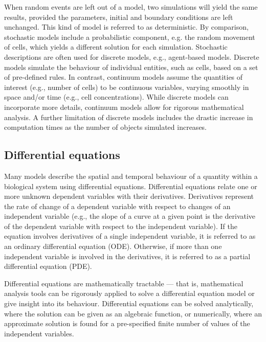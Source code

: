 \documentclass{article}
\begin{document}
When random events are left out of a model, two simulations will yield the same results, provided the parameters, initial and boundary conditions are left unchanged.
This kind of model is referred to as deterministic.
By comparison, stochastic models include a probabilistic component, e.g. the random movement of cells, which yields a different solution for each simulation.
Stochastic descriptions are often used for discrete models, e.g., agent-based models.
Discrete models simulate the behaviour of individual entities, such as cells, based on a set of pre-defined rules.
In contrast, continuum models assume the quantities of interest (e.g., number of cells) to be continuous variables, varying smoothly in space and/or time (e.g., cell concentrations).
While discrete models can incorporate more details, continuum models allow for rigorous mathematical analysis.
A further limitation of discrete models includes the drastic increase in computation times as the number of objects simulated increases.

\subsection{Differential equations}

Many models describe the spatial and temporal behaviour of a quantity within a biological system using differential equations.
Differential equations relate one or more unknown dependent variables with their derivatives. 
Derivatives represent the rate of change of a dependent variable with respect to changes of an independent variable (e.g., the slope of a curve at a given point is the derivative of the dependent variable with respect to the independent variable).
If the equation involves derivatives of a single independent variable, it is referred to as an ordinary differential equation (ODE).
Otherwise, if more than one independent variable is involved in the derivatives, it is referred to as a partial differential equation (PDE).

Differential equations are mathematically tractable --- that is, mathematical analysis tools can be rigorously applied to solve a differential equation model or give insight into its behaviour.
Differential equations can be solved analytically, where the solution can be given as an algebraic function, or numerically, where an approximate solution is found for a pre-specified finite number of values of the independent variables.
\end{document}
